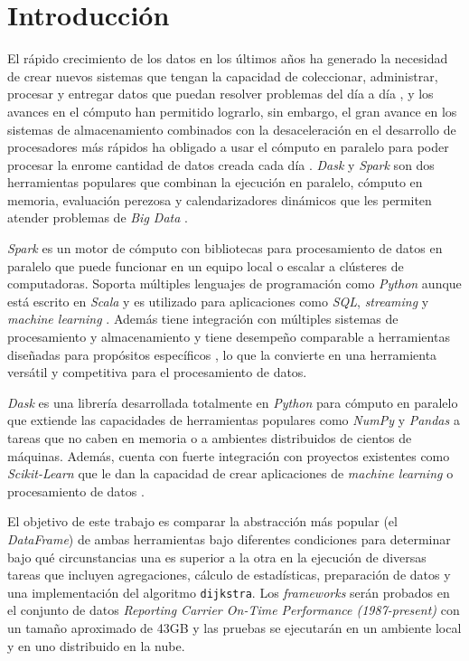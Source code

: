 \chapter*{Introducción}


\noindent El rápido crecimiento de los datos en los últimos años ha generado la necesidad de crear nuevos sistemas que tengan la capacidad de coleccionar, administrar, procesar y entregar datos que puedan resolver problemas del día a día \cite{seagate}, y los avances en el cómputo han permitido lograrlo, sin embargo, el gran avance en los sistemas de almacenamiento combinados con la desaceleración en el desarrollo de procesadores más rápidos ha obligado a usar el cómputo en paralelo para poder procesar la enrome cantidad de datos creada cada día \cite{sparkguide}. \textit{Dask} y \textit{Spark} son dos herramientas populares que combinan la ejecución en paralelo, cómputo en memoria, evaluación perezosa y calendarizadores dinámicos que les permiten atender problemas de \textit{Big Data} \cite{dask-spark-neuroimaging}.

\textit{Spark} es un motor de cómputo con bibliotecas para procesamiento de datos en paralelo que puede funcionar en un equipo local o escalar a clústeres de computadoras. Soporta múltiples lenguajes de programación como \textit{Python} aunque está escrito en \textit{Scala} y es utilizado para aplicaciones como \textit{SQL}, \textit{streaming} y \textit{machine learning} \cite{sparkguide}. Además tiene integración con múltiples sistemas de procesamiento y almacenamiento y tiene desempeño comparable a herramientas diseñadas para propósitos específicos \cite{sparkberkeley}, lo que la convierte en una herramienta versátil y competitiva para el procesamiento de datos. 

\textit{Dask} es una librería desarrollada totalmente en \textit{Python} para cómputo en paralelo que extiende las capacidades de herramientas populares como \textit{NumPy} y \textit{Pandas} a tareas que no caben en memoria o a ambientes distribuidos de cientos de máquinas. Además, cuenta con fuerte integración con proyectos existentes como \textit{Scikit-Learn} que le dan la capacidad de crear aplicaciones de \textit{machine learning} o procesamiento de datos \cite{daskdocs}.


El objetivo de este trabajo es comparar la abstracción más popular (el \textit{DataFrame}) de ambas herramientas bajo diferentes condiciones para determinar bajo qué circunstancias una es superior a la otra en la ejecución de diversas tareas que incluyen agregaciones, cálculo de estadísticas, preparación de datos y una implementación del algoritmo \texttt{dijkstra}. Los \textit{frameworks} serán probados en el conjunto de datos \textit{Reporting Carrier On-Time Performance (1987-present)} con un tamaño aproximado de 43GB y las pruebas se ejecutarán en un ambiente local y en uno distribuido en la nube.

